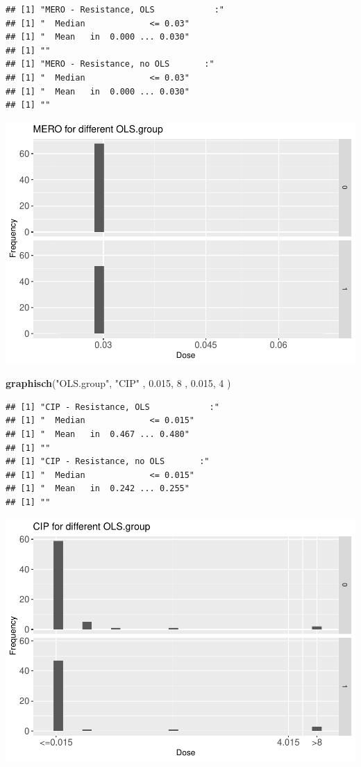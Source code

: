 \documentclass[
]{article}
\newenvironment{Shaded}{\begin{snugshade}}{\end{snugshade}}
\newcommand{\DecValTok}[1]{\textcolor[rgb]{0.00,0.00,0.81}{#1}}
\newcommand{\FloatTok}[1]{\textcolor[rgb]{0.00,0.00,0.81}{#1}}
\newcommand{\KeywordTok}[1]{\textcolor[rgb]{0.13,0.29,0.53}{\textbf{#1}}}
\newcommand{\NormalTok}[1]{#1}
\newcommand{\StringTok}[1]{\textcolor[rgb]{0.31,0.60,0.02}{#1}}
\begin{document}
\begin{verbatim}
## [1] "MERO - Resistance, OLS            :"
## [1] "  Median             <= 0.03"
## [1] "  Mean   in  0.000 ... 0.030"
## [1] ""
## [1] "MERO - Resistance, no OLS       :"
## [1] "  Median             <= 0.03"
## [1] "  Mean   in  0.000 ... 0.030"
## [1] ""
\end{verbatim}

\includegraphics{Verteilungen_files/figure-latex/unnamed-chunk-19-1.pdf}

\begin{Shaded}
\begin{Highlighting}[]
  \KeywordTok{graphisch}\NormalTok{(}\StringTok{"OLS.group"}\NormalTok{, }\StringTok{"CIP"}\NormalTok{ , }\FloatTok{0.015}\NormalTok{,   }\DecValTok{8}\NormalTok{   ,   }\FloatTok{0.015}\NormalTok{,   }\DecValTok{4}\NormalTok{     ) }
\end{Highlighting}
\end{Shaded}

\begin{verbatim}
## [1] "CIP - Resistance, OLS            :"
## [1] "  Median             <= 0.015"
## [1] "  Mean   in  0.467 ... 0.480"
## [1] ""
## [1] "CIP - Resistance, no OLS       :"
## [1] "  Median             <= 0.015"
## [1] "  Mean   in  0.242 ... 0.255"
## [1] ""
\end{verbatim}

\includegraphics{Verteilungen_files/figure-latex/unnamed-chunk-20-1.pdf}
\end{document}
